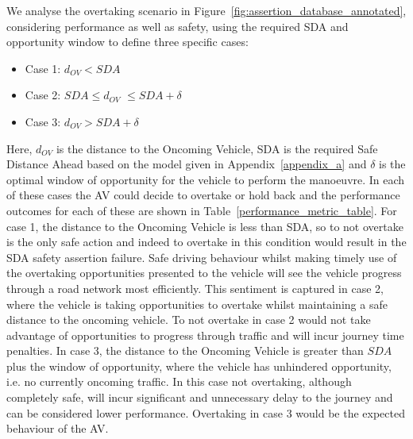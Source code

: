 We analyse the overtaking scenario in Figure~\ref{fig:assertion_database_annotated}, considering performance as well as safety, using the required SDA and opportunity window to define three specific cases:
\begin{itemize}

    \item Case 1: $d_{OV} < SDA$
    \item Case 2: $SDA \leq d_{OV}$ $\leq SDA + \delta$
    \item Case 3: $d_{OV} > SDA + \delta$
\end{itemize}
%
Here, $d_{OV}$ is the distance to the Oncoming Vehicle, SDA is the required Safe Distance Ahead based on the model given in Appendix~\ref{appendix_a} and $\delta$ is the optimal window of opportunity for the vehicle to perform the manoeuvre. 
%
In each of these cases the AV could decide to overtake or hold back and the performance outcomes for each of these are shown in Table~\ref{performance_metric_table}. 
%
For case 1, the distance to the Oncoming Vehicle is less than SDA, so to not overtake is the only safe action and indeed to overtake in this condition would result in the SDA safety assertion failure. Safe driving behaviour whilst making timely use of the overtaking opportunities presented to the vehicle will see the vehicle progress through a road network most efficiently. This sentiment is captured in case 2, where the vehicle is taking opportunities to overtake whilst maintaining a safe distance to the oncoming vehicle. To not overtake in case 2 would not take advantage of opportunities to progress through traffic and will incur journey time penalties. In case 3, the distance to the Oncoming Vehicle is greater than $SDA$ plus the window of opportunity, where the vehicle has unhindered opportunity, i.e. no currently oncoming traffic. In this case not overtaking, although completely safe, will incur significant and unnecessary delay to the journey and can be considered lower performance. Overtaking in case 3 would be the expected behaviour of the AV. %
%

